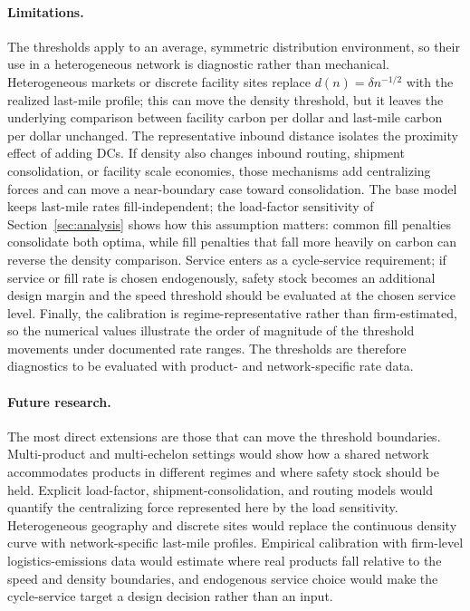 \documentclass[11pt]{article}
\theoremstyle{definition}
\theoremstyle{remark}
\theoremstyle{plain}
\begin{document}
\paragraph{Limitations.} The thresholds apply to an average, symmetric distribution environment, so their use
in a heterogeneous network is diagnostic rather than mechanical. Heterogeneous markets or discrete facility
sites replace $d(n)=\delta n^{-1/2}$ with the realized last-mile profile; this can move the density threshold,
but it leaves the underlying comparison between facility carbon per dollar and last-mile carbon per dollar
unchanged. The representative inbound distance isolates the proximity effect of adding DCs. If density also
changes inbound routing, shipment consolidation, or facility scale economies, those mechanisms add
centralizing forces and can move a near-boundary case toward consolidation. The base model keeps last-mile
rates fill-independent; the load-factor sensitivity of Section~\ref{sec:analysis} shows how this assumption
matters: common fill penalties consolidate both optima, while fill penalties that fall more heavily on carbon
can reverse the density comparison. Service enters as a cycle-service requirement; if service or fill rate is chosen
endogenously, safety stock becomes an additional design margin and the speed threshold should be evaluated at
the chosen service level. Finally, the calibration is regime-representative rather than firm-estimated, so the
numerical values illustrate the order of magnitude of the threshold movements under documented rate ranges.
The thresholds are therefore diagnostics to be evaluated with product- and network-specific rate data.

\paragraph{Future research.} The most direct extensions are those that can move the threshold boundaries.
Multi-product and multi-echelon settings would show how a shared network accommodates products in different
regimes and where safety stock should be held. Explicit load-factor, shipment-consolidation, and routing
models would quantify the centralizing force represented here by the load sensitivity. Heterogeneous geography
and discrete sites would replace the continuous density curve with network-specific last-mile profiles.
Empirical calibration with firm-level logistics-emissions data would estimate where real products fall
relative to the speed and density boundaries, and endogenous service choice would make the cycle-service target
a design decision rather than an input.
\end{document}

